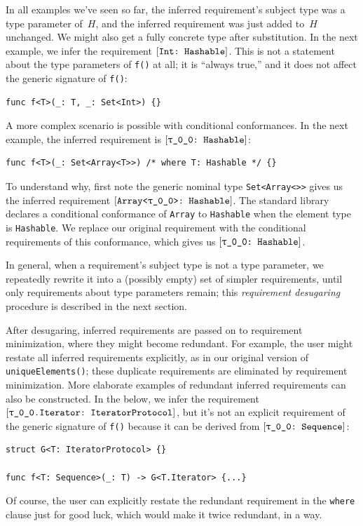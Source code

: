 \documentclass[../generics]{subfiles}
\begin{document}
In all examples we've seen so far, the inferred requirement's subject type was a type parameter of~$H$, and the inferred requirement was just added to~$H$ unchanged. We might also get a fully concrete type after substitution. In the next example, we infer the requirement $[\texttt{Int:~Hashable}]$. This is not a statement about the type parameters of \texttt{f()} at all; it is ``always true,'' and it does not affect the generic signature of \texttt{f()}:
\begin{Verbatim}
func f<T>(_: T, _: Set<Int>) {}
\end{Verbatim}
A more complex scenario is possible with conditional conformances. In the next example, the inferred requirement is $\ConfReq{\rT}{Hashable}$:
\begin{Verbatim}
func f<T>(_: Set<Array<T>>) /* where T: Hashable */ {}
\end{Verbatim}
To understand why, first note the generic nominal type \texttt{Set<Array<\rT>>} gives us the inferred requirement $\ConfReq{Array<\rT>}{Hashable}$. The standard library declares a conditional conformance of \texttt{Array} to \texttt{Hashable} when the element type is \texttt{Hashable}. We replace our original requirement with the conditional requirements of this conformance, which gives us $\ConfReq{\rT}{Hashable}$.

In general, when a requirement's subject type is not a type parameter, we repeatedly rewrite it into a (possibly empty) set of simpler requirements, until only requirements about type parameters remain; this \emph{requirement desugaring} procedure is described in the next section.

After desugaring, inferred requirements are passed on to requirement minimization, where they might become redundant. For example, the user might restate all inferred requirements explicitly, as in our original version of \texttt{uniqueElements()}; these duplicate requirements are eliminated by requirement minimization. More elaborate examples of redundant inferred requirements can also be constructed. In the below, we infer the requirement $\ConfReq{\rT.Iterator}{IteratorProtocol}$, but it's not an explicit requirement of the generic signature of \texttt{f()} because it can be derived from $\rTSequence$:
\begin{Verbatim}
struct G<T: IteratorProtocol> {}

func f<T: Sequence>(_: T) -> G<T.Iterator> {...}
\end{Verbatim}
Of course, the user can explicitly restate the redundant requirement in the \texttt{where} clause just for good luck, which would make it twice redundant, in a way.
\end{document}
